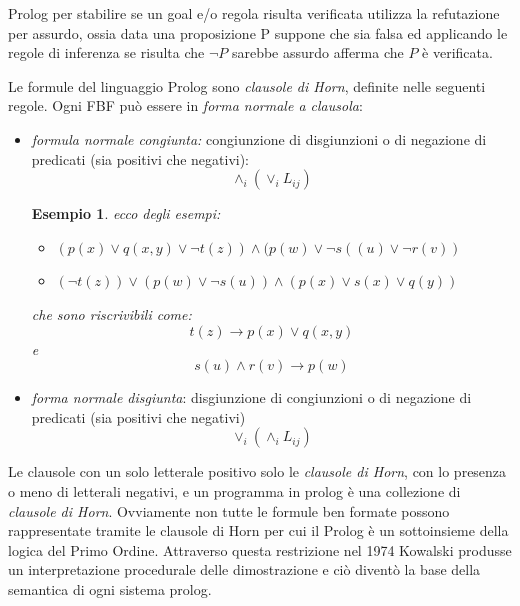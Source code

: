 \documentclass[a4paper]{report}
\newtheorem{esempio}{Esempio}
\begin{document}
Prolog per stabilire se un goal e/o regola risulta verificata utilizza la refutazione per assurdo, ossia data una proposizione P suppone che
sia falsa ed applicando le regole di inferenza se risulta che $\neg P$ sarebbe assurdo afferma che $P$ è verificata.

Le formule del linguaggio Prolog sono \emph{clausole di Horn}, definite nelle seguenti regole.
Ogni FBF può essere in \textit{forma normale a clausola}:
\begin{itemize}
\item \textit{formula normale congiunta:} congiunzione di disgiunzioni o di negazione di predicati (sia positivi che negativi):
  \begin{equation*}
    \land_i(\lor_iL_{ij})
  \end{equation*}
\begin{esempio}
ecco degli esempi:
\begin{itemize}
\item $(p(x)\vee q(x,y)\vee \neg t(z))\wedge(p(w)\vee\neg s((u)\vee \neg r(v))$
\item $(\neg t(z))\vee (p(w)\vee\neg s(u))\wedge (p(x)\vee s(x)\vee q(y))$
\end{itemize}
che sono riscrivibili come:
$$t(z)\to p(x)\vee q(x,y)$$
e
$$s(u)\wedge r(v)\to p(w)$$
\end{esempio}
\item \textit{forma normale disgiunta}: disgiunzione di congiunzioni o di negazione di predicati (sia positivi che negativi)
  \begin{equation*}
    \lor_i(\land_i L_{ij})
  \end{equation*}
\end{itemize}
Le clausole con un solo letterale positivo solo le \textit{clausole di Horn}, con lo presenza o meno di letterali negativi,
e un programma in prolog è una collezione di \textit{clausole di Horn}.\newline
Ovviamente non tutte le formule ben formate possono rappresentate tramite le clausole di Horn per cui il Prolog è un sottoinsieme
della logica del Primo Ordine.\newline
Attraverso questa restrizione nel 1974 Kowalski produsse un interpretazione procedurale delle dimostrazione e ciò diventò la base
della semantica di ogni sistema prolog.
\end{document}
